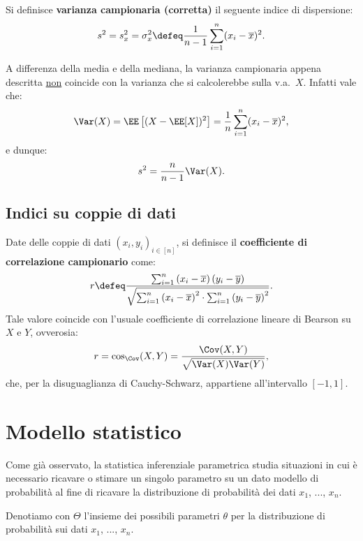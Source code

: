 \begin{multicols*}{2}
\begin{definition}
    Si definisce \textbf{varianza campionaria (corretta)} il seguente
    indice di dispersione:
    \[
        s^2 = s_x^2 = \sigma_x^2 \defeq \frac{1}{n-1} \sum_{i=1}^n (x_i - \overline{x})^2.
    \]
\end{definition}

\begin{warn}
    A differenza della media e della mediana, la varianza campionaria appena
    descritta \underline{non} coincide con la varianza che si calcolerebbe
    sulla v.a.~$X$. Infatti vale che:
    \[
        \Var(X) = \EE\left[(X - \EE[X])^2\right] = \frac{1}{n} \sum_{i=1}^n (x_i - \overline{x})^2,
    \]
    e dunque:
    \[
        s^2 = \frac{n}{n-1} \Var(X).
    \]
\end{warn}

\subsection{Indici su coppie di dati}

\begin{definition}
    Date delle coppie di dati $(x_i, y_i)_{i \in [n]}$, si definisce
    il \textbf{coefficiente di correlazione campionario} come:
    \[
        r \defeq \frac{\sum_{i=1}^n \left(x_i - \overline{x}\right)\left(y_i - \overline{y}\right)}{\sqrt{\sum_{i=1}^n \left(x_i - \overline{x}\right)^2 \cdot \sum_{i=1}^n \left(y_i - \overline{y}\right)^2}}.
    \]
    Tale valore coincide con l'usuale coefficiente di correlazione lineare di Bearson su
    $X$ e $Y$, ovverosia:
    \[
        r = \cos_{\Cov}(X, Y) = \frac{\Cov(X, Y)}{\sqrt{\Var(X) \Var(Y)}},
    \]
    che, per la disuguaglianza di Cauchy-Schwarz, appartiene all'intervallo $[-1, 1]$.
\end{definition}

\section{Modello statistico}

Come già osservato, la statistica inferenziale parametrica studia situazioni in cui
è necessario ricavare o stimare un singolo parametro su un dato modello di probabilità al fine
di ricavare la distribuzione di probabilità dei dati $x_1$, ..., $x_n$.

\begin{notation}
    Denotiamo con $\Theta$ l'insieme dei possibili parametri $\theta$ per la distribuzione
    di probabilità sui dati $x_1$, ..., $x_n$. \smallskip


\end{notation}
\end{multicols*}
